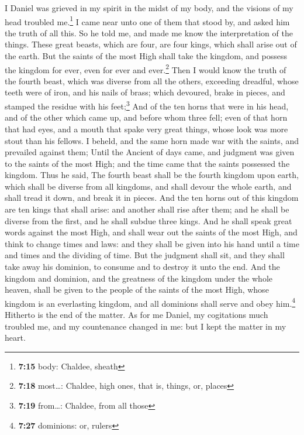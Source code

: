  I Daniel was grieved in my spirit in the midst of my
body, and the visions of my head troubled me.\footnote{\textbf{7:15}
  body: Chaldee, sheath}  I came near unto one of them
that stood by, and asked him the truth of all this. So he told me, and
made me know the interpretation of the things.  These
great beasts, which are four, are four kings, which shall arise out of
the earth.  But the saints of the most High shall take
the kingdom, and possess the kingdom for ever, even for ever and
ever.\footnote{\textbf{7:18} most\ldots: Chaldee, high ones, that is,
  things, or, places}  Then I would know the truth of the
fourth beast, which was diverse from all the others, exceeding dreadful,
whose teeth were of iron, and his nails of brass; which devoured, brake
in pieces, and stamped the residue with his feet;\footnote{\textbf{7:19}
  from\ldots: Chaldee, from all those}  And of the ten
horns that were in his head, and of the other which came up, and before
whom three fell; even of that horn that had eyes, and a mouth that spake
very great things, whose look was more stout than his fellows.
 I beheld, and the same horn made war with the saints,
and prevailed against them;  Until the Ancient of days
came, and judgment was given to the saints of the most High; and the
time came that the saints possessed the kingdom.  Thus he
said, The fourth beast shall be the fourth kingdom upon earth, which
shall be diverse from all kingdoms, and shall devour the whole earth,
and shall tread it down, and break it in pieces.  And the
ten horns out of this kingdom are ten kings that shall arise: and
another shall rise after them; and he shall be diverse from the first,
and he shall subdue three kings.  And he shall speak
great words against the most High, and shall wear out the saints of the
most High, and think to change times and laws: and they shall be given
into his hand until a time and times and the dividing of time.
 But the judgment shall sit, and they shall take away his
dominion, to consume and to destroy it unto the end.  And
the kingdom and dominion, and the greatness of the kingdom under the
whole heaven, shall be given to the people of the saints of the most
High, whose kingdom is an everlasting kingdom, and all dominions shall
serve and obey him.\footnote{\textbf{7:27} dominions: or, rulers}
 Hitherto is the end of the matter. As for me Daniel, my
cogitations much troubled me, and my countenance changed in me: but I
kept the matter in my heart.

